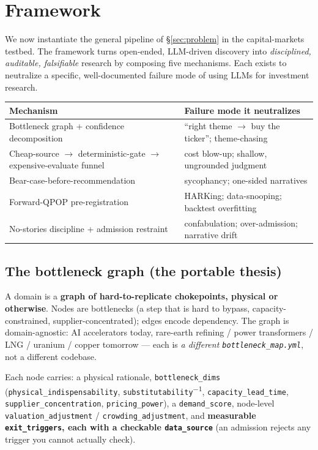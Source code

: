 \documentclass[11pt]{article}
\begin{document}
\section{Framework}

We now instantiate the general pipeline of \S\ref{sec:problem} in the capital-markets testbed.
The framework turns open-ended, LLM-driven discovery into \emph{disciplined, auditable, falsifiable}
research by composing five mechanisms. Each exists to neutralize a specific, well-documented
failure mode of using LLMs for investment research.

\begin{center}
\begin{tabularx}{\linewidth}{@{}LL@{}}
\toprule
\textbf{Mechanism} & \textbf{Failure mode it neutralizes} \\
\midrule
Bottleneck graph + confidence decomposition & ``right theme $\to$ buy the ticker''; theme-chasing \\
Cheap-source $\to$ deterministic-gate $\to$ expensive-evaluate funnel & cost blow-up; shallow, ungrounded judgment \\
Bear-case-before-recommendation & sycophancy; one-sided narratives \\
Forward-QPOP pre-registration & HARKing; data-snooping; backtest overfitting \\
No-stories discipline + admission restraint & confabulation; over-admission; narrative drift \\
\bottomrule
\end{tabularx}
\end{center}

\subsection{The bottleneck graph (the portable thesis)}

A domain is a \textbf{graph of hard-to-replicate chokepoints, physical or otherwise}. Nodes are bottlenecks (a step that is hard to
bypass, capacity-constrained, supplier-concentrated); edges encode dependency. The graph is
domain-agnostic: AI accelerators today, rare-earth refining / power transformers / LNG / uranium /
copper tomorrow --- each is \emph{a different \texttt{bottleneck\_map.yml}}, not a different codebase.

Each node carries: a physical rationale, \texttt{bottleneck\_dims}
(\texttt{physical\_indispensability}, \texttt{substitutability}\textsuperscript{$-1$},
\texttt{capacity\_lead\_time}, \texttt{supplier\_concentration}, \texttt{pricing\_power}), a
\texttt{demand\_score}, node-level \texttt{valuation\_adjustment} / \texttt{crowding\_adjustment},
and \textbf{measurable \texttt{exit\_triggers}, each with a checkable \texttt{data\_source}} (an
admission rejects any trigger you cannot actually check).
\end{document}
